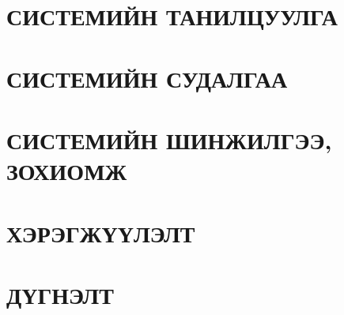 \chapter{СИСТЕМИЙН ТАНИЛЦУУЛГА}


\chapter{СИСТЕМИЙН СУДАЛГАА}


\chapter{СИСТЕМИЙН ШИНЖИЛГЭЭ, ЗОХИОМЖ}


\chapter{ХЭРЭГЖҮҮЛЭЛТ}


\chapter{ДҮГНЭЛТ}


